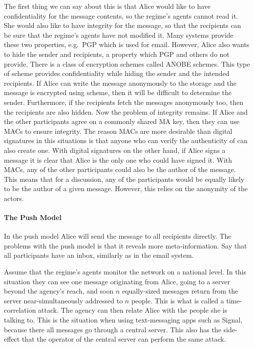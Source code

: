 The first thing we can say about this is that Alice would like to have 
confidentiality for the message contents, so the regime's agents cannot read 
it.
She would also like to have integrity for the message, so that the recipients 
can be sure that the regime's agents have not modified it.
Many systems provide these two properties, e.g.\ \ac{PGP} which is used for 
email.
However, Alice also wants to hide the sender and recipients, a property which 
\ac{PGP} and others do not provide.
There is a class of encryption schemes called \ac{ANOBE} schemes.
This type of scheme provides confidentiality while hiding the sender and the 
intended recipients.
If Alice can write the message anonymously to the storage and the message is 
encrypted using  scheme, then it will be difficult to determine the 
sender.
Furthermore, if the recipients fetch the messages anonymously too, then the 
recipients are also hidden.
Now the problem of integrity remains.
If Alice and the other participants agree on a commonly shared \ac{MA} key, 
then they can use \acp{MAC} to ensure integrity.
The reason \acp{MAC} are more desirable than digital signatures in this 
situations is that anyone who can verify the authenticity of  can also 
create one.
With digital signatures on the other hand, if Alice signs a message it is clear 
that Alice is the only one who could have signed it.
With \acp{MAC}, any of the other participants could also be the author of the 
message.
This means that for a discussion, any of the participants would be equally 
likely to be the author of a given message.
However, this relies on the anonymity of the actors.

\paragraph{The Push Model}
In the push model Alice will send the message to all recipients directly.
The problems with the push model is that it reveals more meta-information.
Say that all participants have an inbox, similarly as in the email system.

Assume that the regime's agents monitor the network on a national level.
In this situation they can see one message originating from Alice, going to 
a server beyond the agency's reach, and soon \(n\) equally-sized messages 
return from the server near-simultaneously addressed to \(n\) people.
This is what is called a time-correlation attack.
The agency can then relate Alice with the people she is talking to.
This is the situation when using text-messaging apps such as Signal, because 
there all messages go through a central server.
This also has the side-effect that the operator of the central server can 
perform the same attack.

